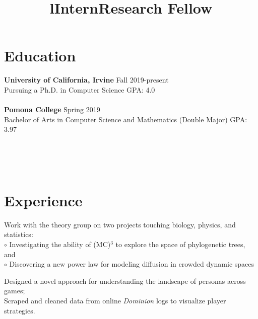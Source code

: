 \documentclass[margin]{res}
\begin{document}
\begin{resume}

\section{Education}
\textbf{University of California, Irvine} \hfill Fall 2019-present\\
Pursuing a Ph.D. in Computer Science \hfill GPA: 4.0\\ \\
\textbf{Pomona College} \hfill Spring 2019\\
Bachelor of Arts in Computer Science and Mathematics (Double Major) \hfill 
GPA: 3.97



\begin{format}
\title{l}\\
\\
\body\\
\end{format}
\section{Experience}

\title{\textbf{Intern}}
\begin{position}
Work with the theory group on two projects touching biology, physics, and statistics:\\
$\circ$ Investigating the ability of (MC)$^3$ to explore the space of phylogenetic trees, and \\
$\circ$ Discovering a new power law for modeling diffusion in crowded dynamic spaces
\end{position}


\title{\textbf{Research Fellow}}
\begin{position}
Designed a novel approach for understanding the landscape of personas across games;\\
Scraped and cleaned data from online \emph{Dominion} logs to visualize player strategies.
\end{position}


\end{resume}
\end{document}

